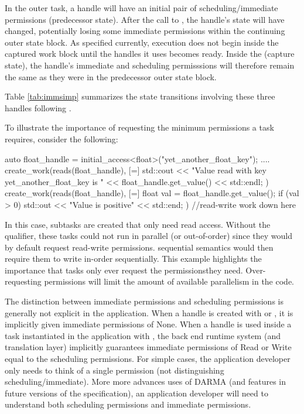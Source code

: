 In the outer \gls{task}, a \gls{handle} will have an initial pair of
scheduling/immediate permissions (predecessor state).
After the call to , the \gls{handle}'s state will have
changed, potentially losing some \gls{immediate permissions} within the
continuing outer state block.
As specified currently, execution does not begin inside the \gls{captured work}
block until the \glspl{handle} it uses becomes ready.
Inside the \cwork (capture state), the \gls{handle}'s immediate and scheduling
permisssions will therefore remain the same as they were in the predecessor outer
state block.

Table \ref{tab:immsimp} summarizes the state transitions involving these three
\glspl{handle} following \cwork.

To illustrate the importance of requesting the minimum permissions a \gls{task}
requires, consider the following:
\begin{CppCode}
auto float_handle = initial_access<float>("yet_another_float_key");
....
create_work(reads(float_handle), [=] {
  std::cout << "Value read with key yet_another_float_key is " 
          << float_handle.get_value() << std::endl;
})
create_work(reads(float_handle), [=] {
  float val = float_handle.get_value();
  if (val > 0) std::out << "Value is positive" << std::end;
})
//read-write work down here
\end{CppCode}
In this case, \glspl{subtask} are created that only need read access. 
Without the  qualifier, these \glspl{task} could not run in parallel (or out-of-order) since they
would by default request read-write permissions.
\Gls{sequential semantics} would then require them to write in-order sequentially.
This example highlights the importance that \glspl{task} only ever request the
permissionsthey need. 
Over-requesting permissions will limit the amount of available parallelism in the code.


The distinction between \gls{immediate permissions} and \gls{scheduling permissions} is generally not explicit in the application.
When a \gls{handle} is created with  or ,
it is implicitly given \gls{immediate permissions} of None.
When a \gls{handle} is used inside a \gls{task} instantiated in the application with ,
the \gls{back end} \gls{runtime system} (and \gls{translation layer}) implicitly guarantees immediate 
permissions of Read or Write equal to the \gls{scheduling permissions}.
For simple cases, the application developer only needs to think of a single permission (not distinguishing scheduling/immediate).
More more advances uses of \gls{DARMA} (and features in future versions of the
specification), an application developer will need to understand both
\gls{scheduling permissions} and \gls{immediate permissions}.

